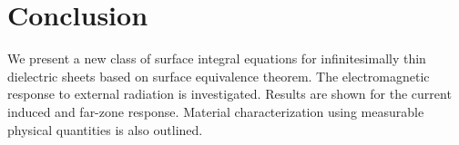 \documentclass[conference, 10pt]{IEEEtran}
\renewcommand{\^}{\hat}  %
\begin{document}
\section{Conclusion}
%
We present a new class of surface integral equations for infinitesimally thin dielectric sheets based on surface equivalence theorem. The electromagnetic response to external radiation is investigated. Results are shown for the current induced and far-zone response. Material characterization using measurable physical quantities is also outlined.
%


\end{document}
